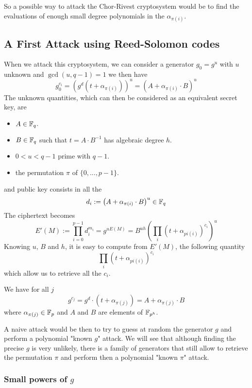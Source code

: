 \documentclass[a4paper]{article}
\newcommand{\GF}[1]{\F_{#1}}
\begin{document}
So a possible way to attack the Chor-Rivest cryptosystem would be to find the evaluations of enough small degree polynomials in the $\alpha_{\pi(i)}$.



\subsection{A First Attack using Reed-Solomon codes}


When we attack this cryptosystem, we can consider a generator $g_0 = g^u$ with $u$ unknown and $\gcd(u, q-1) = 1$ we then have
$$ g_0^{c_i} = \left( g^d \left( t + \alpha_{\pi(i)} \right) \right)^u = \left(A + \alpha_{\pi(i)} \cdot B\right)^u$$
The unknown quantities, which can then be considered as an equivalent secret key, are
\begin{itemize}
\item $A \in \mathbb{F}_q$.
\item $B \in \mathbb{F}_q$ such that $t = A\cdot B^{-1}$ has algebraic degree $h$.
\item $0 < u < q-1$ prime with $q-1$.
\item the permutation $\pi$ of $\{ 0, ... , p-1 \}$.
\end{itemize}
and public key consists in all the
$$ d_i := \left(A + \alpha_{\pi(i)} \cdot B\right)^u \in \mathbb{F}_q$$
The ciphertext becomes
$$ E'(M) := \prod_{i=0}^{p-1} d_i^{m_i} = g^{uE(M)} = B^{uh} \left( \prod_i \left( t + \alpha_{pi(i)}\right)^{c_i} \right)^u$$
Knowing $u$, $B$ and $h$, it is easy to compute from $E'(M)$, the following quantity
$$ \prod_i \left( t + \alpha_{pi(i)}\right)^{c_i} $$
which allow us to retrieve all the $c_i$.



We have for all $j$
$$ g^{c_j} = g^d \cdot (t + \alpha_{\pi(j)} ) = A + \alpha_{\pi(j)} \cdot B $$
where $\alpha_{\pi(j)} \in \GF{p}$ and $A$ and $B$ are elements of $\GF{p^h}$.

A naive attack would be then to try to guess at random the generator $g$ and perform a polynomial "known $g$" attack. We will see that although finding the precise $g$ is very unlikely, there is a family of generators that still allow to retrieve the permutation $\pi$ and perform then a polynomial "known $\pi$" attack.

\subsubsection{Small powers of $g$}
\end{document}
